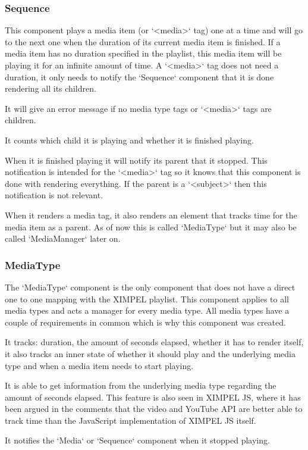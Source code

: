 \subsubsection{Sequence}
This component plays a media item (or `<media>` tag) one at a time and will go to the next one when the duration of its current media item is finished. If a media item has no duration specified in the playlist, this media item will be playing it for an infinite amount of time. A `<media>` tag does not need a duration, it only needs to notify the `Sequence` component that it is done rendering all its children.

It will give an error message if no media type tags or `<media>` tags are children.

It counts which child it is playing and whether it is finished playing.

When it is finished playing it will notify its parent that it stopped. This notification is intended for the `<media>` tag so it knows that this component is done with rendering everything. If the parent is a `<subject>` then this notification is not relevant.

When it renders a media tag, it also renders an element that tracks time for the media item as a parent. As of now this is called `MediaType` but it may also be called `MediaManager` later on. 

\subsubsection{MediaType}
The `MediaType` component is the only component that does not have a direct one to one mapping with the XIMPEL playlist. This component applies to all media types and acts a manager for every media type. All media types have a couple of requirements in common which is why this component was created.

It tracks: duration, the amount of seconds elapsed, whether it has to render itself, it also tracks an inner state of whether it should play and the underlying media type and when a media item needs to start playing.

It is able to get information from the underlying media type regarding the amount of seconds elapsed. This feature is also seen in XIMPEL JS, where it has been argued in the comments that the video and YouTube API are better able to track time than the JavaScript implementation of XIMPEL JS itself.

It notifies the `Media` or `Sequence` component when it stopped playing.

